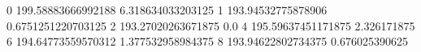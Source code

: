 0 199.58883666992188 6.318634033203125
1 193.94532775878906 0.6751251220703125
2 193.27020263671875 0.0
4 195.59637451171875 2.326171875
6 194.64773559570312 1.377532958984375
8 193.94622802734375 0.676025390625
